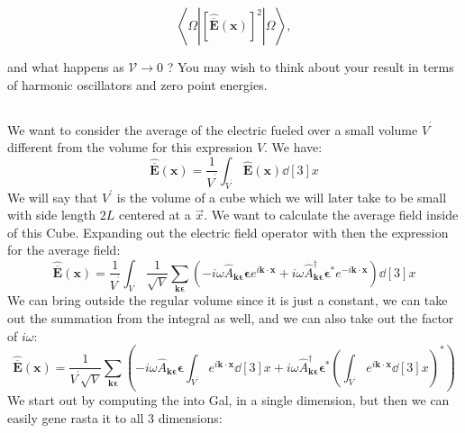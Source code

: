 \documentclass[12pt]{article}
\begin{document}
\begin{equation*}
\left\langle\Omega\left|[\hat{\overline{\mathbf{E}}}(\mathbf{x})]^{2}\right| \Omega\right\rangle, \tag{9}
\end{equation*}


and what happens as $\mathcal{V} \rightarrow 0$ ? You may wish to think about your result in terms of harmonic oscillators and zero point energies.
\subsection{}
We want to consider the average of the electric fueled over a small volume $V^{^{\prime}}$ different from the volume for this expression $V$. We have:
\begin{equation}
  \hat{\overline{\mathbf{E}}}(\mathbf{x})=\frac{1}{V^{^{\prime}}} \int_{V^{^{\prime}}}\hat{\mathbf{E}}(\mathbf{x})\dd[3]{x} 
\end{equation}
We will say that $V^{\prime}$ is the volume of a cube which we will later take to be small with side length $2L$ centered at a $\vec{x}$. We want to calculate the average field inside of this Cube. Expanding out the electric field operator with then the expression for the average field:
\begin{equation}
  \hat{\overline{\mathbf{E}}}(\mathbf{x})=\frac{1}{V^{^{\prime}}} \int_{V^{^{\prime}}}\frac{1}{\sqrt{V}} \sum_{\mathbf{k} \boldsymbol{\epsilon}}\left(-i \omega \hat{A}_{\mathbf{k} \boldsymbol{\epsilon}} \boldsymbol{\epsilon} e^{i \mathbf{k} \cdot \mathbf{x}}+i \omega \hat{A}_{\mathbf{k} \boldsymbol{\epsilon}}^{\dagger} \boldsymbol{\epsilon}^{*} e^{-i \mathbf{k} \cdot \mathbf{x}}\right)\dd[3]{x}
\end{equation}
We can bring outside the regular volume since it is just a constant, we can take out the summation from the integral as well, and we can also take out the factor of $i \omega$:
\begin{equation}
  \hat{\overline{\mathbf{E}}}(\mathbf{x})=\frac{1}{V^{^{\prime}}\sqrt{V}} \sum_{\mathbf{k} \boldsymbol{\epsilon}}\left(-i \omega \hat{A}_{\mathbf{k} \boldsymbol{\epsilon}} \boldsymbol{\epsilon} \int_{V^{^{\prime}}}e^{i \mathbf{k} \cdot \mathbf{x}}\dd[3]{x}+i \omega \hat{A}_{\mathbf{k} \boldsymbol{\epsilon}}^{\dagger} \boldsymbol{\epsilon}^{*} \left(\int_{V^{^{\prime}}}e^{i \mathbf{k} \cdot \mathbf{x}}\dd[3]{x}\right)^*\right)
\end{equation}
We start out by computing the into Gal, in a single dimension, but then we can easily gene rasta it to all 3 dimensions:
\end{document}
